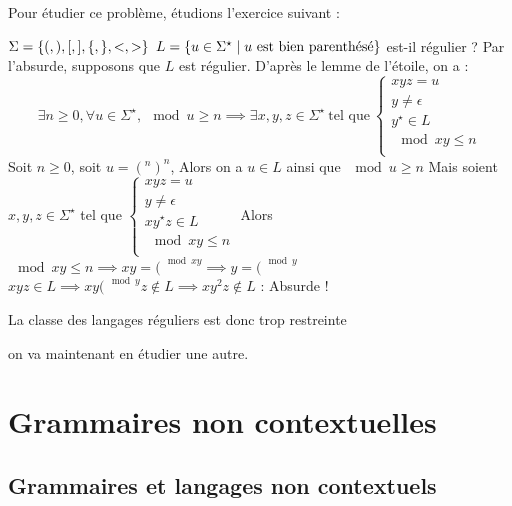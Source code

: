 \documentclass[a4paper,french,bookmarks]{book}
\begin{document}
    Pour étudier ce problème, étudions l'exercice suivant :
    \begin{exercise}{}{}
        $\Sigma = \left\{(, ), [, ], \{, \}, <, >\right\}$
        $L = \left\{u \in \Sigma^\star \;\middle\vert\; u \ \text{est bien parenthésé}\right\}$ est-il régulier ?
        \tcblower
        Par l'absurde, supposons que $L$ est  régulier. D'après le lemme de l'étoile, on a :
        \[\exists n \geq 0, \forall u \in \Sigma^\star, \mod{u} \geq n \implies \exists x, y, z \in \Sigma^\star \ \text{tel que} \ \left\lbrace\begin{array}{l}
            xyz = u\\
            y \neq \epsilon\\
            y^\star \in L\\
            \mod{xy} \leq n\\
        \end{array}\right.\]
        Soit $n \geq 0$, soit $u = (^n )^n$,
        Alors on a $u \in L$ ainsi que $\mod{u} \geq n$
        Mais soient $x, y, z \in \Sigma^\star$ tel que
        $\left\lbrace\begin{array}{l}
            xyz = u\\
            y \neq \epsilon\\
            xy^\star z \in L\\
            \mod{xy} \leq n\\
        \end{array}\right.$
        Alors $\mod{xy} \leq n \implies xy = (^{\mod{xy}} \implies y = (^{\mod{y}}$
        $xyz \in L \implies xy(^{\mod{y}}z \not\in L \implies xy^2z \notin L$ : Absurde !
        
    \end{exercise}
    
    La classe des langages réguliers est donc trop restreinte
    
    on va maintenant en étudier une autre.
    
    \section{Grammaires non contextuelles}
        
    \subsection{Grammaires et langages non contextuels}
    
\end{document}
